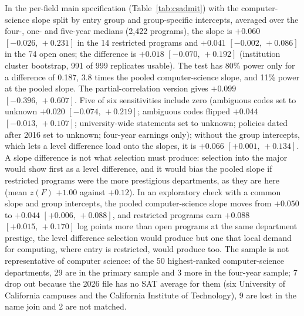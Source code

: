 \documentclass[11pt]{article}
\newcommand{\ci}[2]{$[#1,\allowbreak\,#2]$}
\begin{document}
In the per-field main specification (Table~\ref{tab:csadmit}) with the computer-science slope split by entry group and group-specific
intercepts, averaged over the four-, one- and five-year medians (2,422 programs), the slope is $+0.060$
\ci{-0.026}{+0.231} in the 14 restricted programs and $+0.041$ \ci{-0.002}{+0.086} in the 74 open ones; the
difference is $+0.018$ \ci{-0.070}{+0.192} (institution cluster bootstrap, 991 of 999 replicates usable). The test
has 80\% power only for a difference of 0.187, 3.8 times the pooled computer-science slope, and 11\% power at the
pooled slope. The partial-correlation version gives $+0.099$ \ci{-0.396}{+0.607}. Five of six sensitivities include
zero (ambiguous codes set to unknown $+0.020$ \ci{-0.074}{+0.219}; ambiguous codes flipped $+0.044$
\ci{-0.013}{+0.107}; university-wide statements set to unknown; policies dated after 2016 set to unknown; four-year
earnings only); without the group intercepts, which lets a level difference load onto the slopes, it is $+0.066$
\ci{+0.001}{+0.134}. A slope difference is not what selection must produce: selection into the major would show
first as a level difference, and it would bias the pooled slope if restricted programs were the more prestigious
departments, as they are here (mean $z(F)$ $+1.00$ against $+0.12$). In an exploratory check with a common slope and
group intercepts, the pooled computer-science slope moves from $+0.050$ to $+0.044$ \ci{+0.006}{+0.088}, and restricted
programs earn $+0.088$ \ci{+0.015}{+0.170} log points more than open programs at the same department prestige, the
level difference selection would produce but one that local demand for computing, where entry is restricted, would
produce too. The sample is not representative of computer science: of the 50 highest-ranked computer-science
departments, 29 are in the primary sample and 3 more in the four-year sample; 7 drop out because the 2026 file has
no SAT average for them (six University of California campuses and the California Institute of Technology), 9 are
lost in the name join and 2 are not matched.
\end{document}
